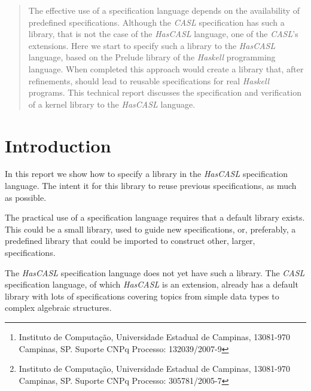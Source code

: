 \documentclass[12pt,twoside]{article}
\numberwithin{spec}{subsection}
\numberwithin{proof}{subsection}
\numberwithin{figure}{subsection}
\numberwithin{code}{subsection}
\begin{document}
\author{Glauber Módolo Cabral\thanks{Instituto  de Computação, Universidade Estadual  de Campinas, 13081-970  Campinas,  SP.  Suporte CNPq Processo: 132039/2007-9}\and Arnaldo Vieira Moura\thanks{Instituto  de Computação, Universidade Estadual  de Campinas, 13081-970  Campinas,  SP. Suporte CNPq Processo: 305781/2005-7}}

\date{}

\maketitle




\begin{abstract}
The effective use of a specification language depends on the availability of predefined specifications. Although the \textit{CASL} specification has such a library, that is not the case of the \textit{HasCASL} language, one of the \textit{CASL}'s extensions. Here we start to  specify such a library to the \textit{HasCASL} language, based on the Prelude library of the \textit{Haskell} programming language. When completed this approach would create a library that, after refinements, should lead to reusable specifications for real \textit{Haskell} programs. This technical report discusses the specification and verification of a kernel library to the \textit{HasCASL} language.
\end{abstract}

\section{Introduction}
In this report we show how to specify a library in the \textit{HasCASL} specification language. The intent it for this library to reuse previous specifications, as much as possible.

The practical use of a specification language requires that a default library exists. This could be a small library, used to guide new specifications, or, preferably, a predefined library that could be imported to construct other, larger, specifications.

The \textit{HasCASL} specification language does not yet have such a library. The \textit{CASL} specification language, of which \textit{HasCASL} is an extension, already has a default library with lots of specifications covering topics from simple data types to complex algebraic structures.
\end{document}
